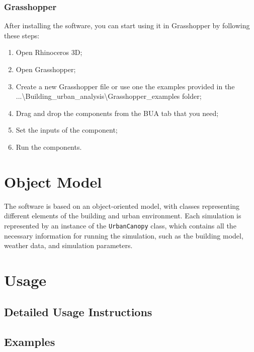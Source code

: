 \documentclass[a4paper,12pt]{article} %
\begin{document}
    \subsubsection{Grasshopper}
    After installing the software, you can start using it in Grasshopper by following these steps:
    \begin{enumerate}
        \item Open Rhinoceros 3D;
        \item Open Grasshopper;
        \item Create a new Grasshopper file or use one the examples provided in the ...\textbackslash Building\_urban\_analysis\textbackslash Grasshopper\_examples folder;
        \item Drag and drop the components from the BUA tab that you need;
        \item Set the inputs of the component;
        \item Run the components.
    \end{enumerate}



\section{Object Model}
The software is based on an object-oriented model, with classes representing different elements of the building and urban environment.
Each simulation is represented by an instance of the \texttt{UrbanCanopy} class, which contains all the necessary information for running the simulation, such as the building model, weather data, and simulation parameters.

    \section{Usage}

    \subsection{Detailed Usage Instructions}

    \subsection{Examples}
\end{document}
